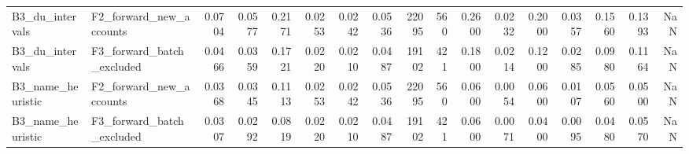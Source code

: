 \begin{table}
\begin{tabular}{llrrrrrrrrrrrrrrr}
B3\_du\_intervals & F2\_forward\_new\_accounts & 0.0704 & 0.0577 & 0.2171 & 0.0253 & 0.0242 & 0.0536 & 22095 & 560 & 0.2600 & 0.0232 & 0.2000 & 0.0357 & 0.1560 & 0.1393 & NaN \\
B3\_du\_intervals & F3\_forward\_batch\_excluded & 0.0466 & 0.0359 & 0.1721 & 0.0220 & 0.0210 & 0.0487 & 19102 & 421 & 0.1800 & 0.0214 & 0.1200 & 0.0285 & 0.0980 & 0.1164 & NaN \\
B3\_name\_heuristic & F2\_forward\_new\_accounts & 0.0368 & 0.0345 & 0.1113 & 0.0253 & 0.0242 & 0.0536 & 22095 & 560 & 0.0600 & 0.0054 & 0.0600 & 0.0107 & 0.0560 & 0.0500 & NaN \\
B3\_name\_heuristic & F3\_forward\_batch\_excluded & 0.0307 & 0.0292 & 0.0819 & 0.0220 & 0.0210 & 0.0487 & 19102 & 421 & 0.0600 & 0.0071 & 0.0400 & 0.0095 & 0.0480 & 0.0570 & NaN \\
\bottomrule
\end{tabular}
\end{table}

